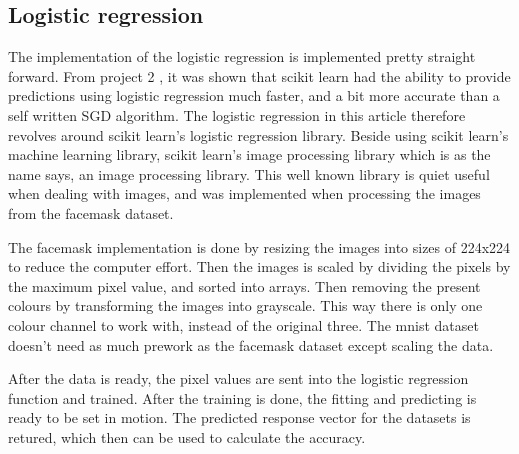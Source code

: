 \documentclass[../main.tex]{subfiles}
\begin{document}
\subsection{Logistic regression}
The implementation of the logistic regression is implemented pretty straight forward. From project 2 \cite{project2}, it was shown that scikit learn had the ability to provide predictions using logistic regression much faster, and a bit more accurate than a self written SGD algorithm. The logistic regression in this article therefore revolves around scikit learn's logistic regression library. Beside using scikit learn's machine learning library, scikit learn's image processing library which is as the name says, an image processing library. This well known library is quiet useful when dealing with images, and was implemented when processing the images from the facemask dataset.

The facemask implementation is done by resizing the images into sizes of 224x224 to reduce the computer effort. Then the images is scaled by dividing the pixels by the maximum pixel value, and sorted into arrays. Then removing the present colours by transforming the images into grayscale. This way there is only one colour channel to work with, instead of the original three. The mnist dataset doesn't need as much prework as the facemask dataset except scaling the data.

After the data is ready, the pixel values are sent into the logistic regression function and trained. After the training is done, the fitting and predicting is ready to be set in motion. The predicted response vector for the datasets is retured, which then can be used to calculate the accuracy.
\end{document}
